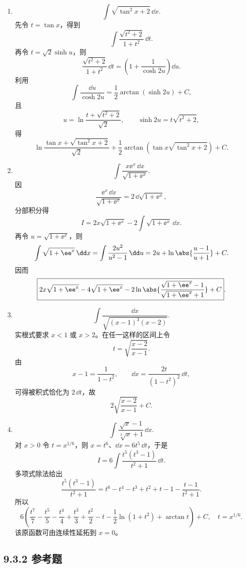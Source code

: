 \begin{enumerate}
\begin{enumerate}[label=(\arabic*)]
    \item
    \[
      \int\sqrt{\tan^2x+2}\,\dd x.
    \]
    先令 $t=\tan x$，得到
    \[
      \int\frac{\sqrt{t^2+2}}{1+t^2}\,\dd t.
    \]
    再令 $t=\sqrt2\sinh u$，则
    \[
      \frac{\sqrt{t^2+2}}{1+t^2}\,\dd t
      =\left(1+\frac1{\cosh2u}\right)\dd u.
    \]
    利用
    \[
      \int\frac{\dd u}{\cosh2u}
      =\frac12\arctan(\sinh2u)+C,
    \]
    且
    \[
      u=\ln\frac{t+\sqrt{t^2+2}}{\sqrt2},
      \qquad
      \sinh2u=t\sqrt{t^2+2},
    \]
    得
    \[
      \boxed{
      \ln\frac{\tan x+\sqrt{\tan^2x+2}}{\sqrt2}
      +\frac12\arctan\left(\tan x\sqrt{\tan^2x+2}\right)+C}.
    \]

    \item
    \[
      \int\frac{x\ee^x\,\dd x}{\sqrt{1+\ee^x}}.
    \]
    因
    \[
      \frac{\ee^x\,\dd x}{\sqrt{1+\ee^x}}
      =2\,\dd\sqrt{1+\ee^x},
    \]
    分部积分得
    \[
      I=2x\sqrt{1+\ee^x}-2\int\sqrt{1+\ee^x}\,\dd x.
    \]
    再令 $u=\sqrt{1+\ee^x}$，则
    \[
      \int\sqrt{1+\ee^x}\,\dd x
      =\int\frac{2u^2}{u^2-1}\,\dd u
      =2u+\ln\abs{\frac{u-1}{u+1}}+C.
    \]
    因而
    \[
      \boxed{
      2x\sqrt{1+\ee^x}-4\sqrt{1+\ee^x}
      -2\ln\abs{\frac{\sqrt{1+\ee^x}-1}{\sqrt{1+\ee^x}+1}}+C}.
    \]

    \item
    \[
      \int\frac{\dd x}{\sqrt{(x-1)^3(x-2)}}.
    \]
    实根式要求 $x<1$ 或 $x>2$。在任一这样的区间上令
    \[
      t=\sqrt{\frac{x-2}{x-1}}.
    \]
    由
    \[
      x-1=\frac1{1-t^2},
      \qquad
      \dd x=\frac{2t}{(1-t^2)^2}\,\dd t,
    \]
    可得被积式恰化为 $2\,\dd t$，故
    \[
      \boxed{2\sqrt{\frac{x-2}{x-1}}+C}.
    \]

    \item
    \[
      \int\frac{\sqrt{x}-1}{\sqrt[3]{x}+1}\,\dd x.
    \]
    对 $x>0$ 令 $t=x^{1/6}$，则 $x=t^6$、$\dd x=6t^5\,\dd t$，于是
    \[
      I=6\int\frac{t^5(t^3-1)}{t^2+1}\,\dd t.
    \]
    多项式除法给出
    \[
      \frac{t^5(t^3-1)}{t^2+1}
      =t^6-t^4-t^3+t^2+t-1-\frac{t-1}{t^2+1}.
    \]
    所以
    \[
      \boxed{
      6\left(
        \frac{t^7}{7}-\frac{t^5}{5}-\frac{t^4}{4}
        +\frac{t^3}{3}+\frac{t^2}{2}-t
        -\frac12\ln(1+t^2)+\arctan t
      \right)+C,
      \quad t=x^{1/6}}.
    \]
    该原函数可由连续性延拓到 $x=0$。
  \end{enumerate}
\end{enumerate}

\subsection*{9.3.2 参考题}

